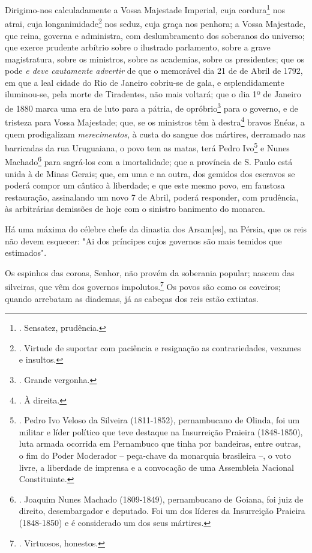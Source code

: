 Dirigimo-nos calculadamente a Vossa Majestade Imperial, cuja
cordura\footnote{. Sensatez, prudência.} nos atrai, cuja
longanimidade\footnote{. Virtude de suportar com paciência e resignação
  as contrariedades, vexames e insultos.} nos seduz, cuja graça nos
penhora; a Vossa Majestade, que reina, governa e administra, com
deslumbramento dos soberanos do universo; que exerce prudente arbítrio
sobre o ilustrado parlamento, sobre a grave magistratura, sobre os
ministros, sobre as academias, sobre os presidentes; que os pode \emph{e
deve cautamente advertir} de que o memorável dia 21 de de Abril de 1792,
em que a leal cidade do Rio de Janeiro cobriu-se de gala, e
esplendidamente iluminou-se, pela morte de Tiradentes, não mais voltará;
que o dia 1º de Janeiro de 1880 marca uma era de luto para a pátria, de
opróbrio\footnote{. Grande vergonha.} para o governo, e de tristeza para
Vossa Majestade; que, se os ministros têm à destra\footnote{. À direita.}
bravos Enéas, a quem prodigalizam \emph{merecimentos}, à custa do sangue
dos mártires, derramado nas barricadas da rua Uruguaiana, o povo tem as
matas, terá Pedro Ivo\footnote{. Pedro Ivo Veloso da Silveira
  (1811-1852), pernambucano de Olinda, foi um militar e líder político
  que teve destaque na Insurreição Praieira (1848-1850), luta armada
  ocorrida em Pernambuco que tinha por bandeiras, entre outras, o fim do
  Poder Moderador -- peça-chave da monarquia brasileira --, o voto
  livre, a liberdade de imprensa e a convocação de uma Assembleia
  Nacional Constituinte.} e Nunes Machado\footnote{. Joaquim Nunes
  Machado (1809-1849), pernambucano de Goiana, foi juiz de direito,
  desembargador e deputado. Foi um dos líderes da Insurreição Praieira
  (1848-1850) e é considerado um dos seus mártires.} para sagrá-los com
a imortalidade; que a província de S. Paulo está unida à de Minas
Gerais; que, em uma e na outra, dos gemidos dos escravos se poderá
compor um cântico à liberdade; e que este mesmo povo, em faustosa
restauração, assinalando um novo 7 de Abril, poderá responder, com
prudência, às arbitrárias demissões de hoje com o sinistro banimento do
monarca.

Há uma máxima do célebre chefe da dinastia dos Arsam{[}es{]}, na Pérsia,
que os reis não devem esquecer: "Ai dos príncipes cujos governos são
mais temidos que estimados".

Os espinhos das coroas, Senhor, não provém da soberania popular; nascem
das silveiras, que vêm dos governos impolutos.\footnote{. Virtuosos,
  honestos.} Os povos são como os coveiros; quando arrebatam as
diademas, já as cabeças dos reis estão extintas.

